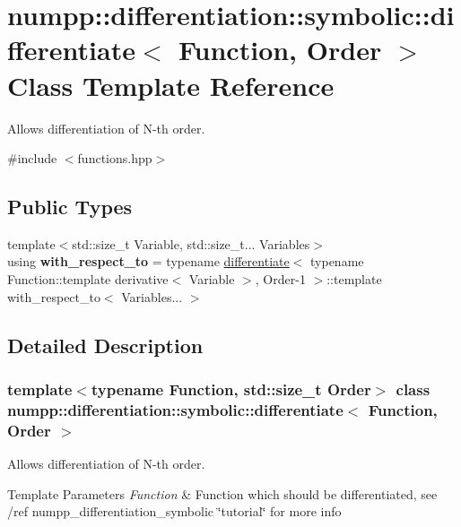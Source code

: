 \hypertarget{classnumpp_1_1differentiation_1_1symbolic_1_1differentiate}{}\section{numpp\+:\+:differentiation\+:\+:symbolic\+:\+:differentiate$<$ Function, Order $>$ Class Template Reference}
\label{classnumpp_1_1differentiation_1_1symbolic_1_1differentiate}


Allows differentiation of N-\/th order.  




{\ttfamily \#include $<$functions.\+hpp$>$}

\subsection*{Public Types}
\begin{DoxyCompactItemize}
\item 
\mbox{\label{classnumpp_1_1differentiation_1_1symbolic_1_1differentiate_ac0c973a49c1b2e262edd5345c4f569a7}} 
{\footnotesize template$<$std\+::size\+\_\+t Variable, std\+::size\+\_\+t... Variables$>$ }\\using {\bfseries with\+\_\+respect\+\_\+to} = typename \hyperlink{classnumpp_1_1differentiation_1_1symbolic_1_1differentiate}{differentiate}$<$ typename Function\+::template derivative$<$ Variable $>$, Order-\/1 $>$\+::template with\+\_\+respect\+\_\+to$<$ Variables... $>$
\end{DoxyCompactItemize}


\subsection{Detailed Description}
\subsubsection*{template$<$typename Function, std\+::size\+\_\+t Order$>$\newline
class numpp\+::differentiation\+::symbolic\+::differentiate$<$ Function, Order $>$}

Allows differentiation of N-\/th order. 


\begin{DoxyTemplParams}{Template Parameters}
{\em Function} & Function which should be differentiated, see /ref numpp\+\_\+differentiation\+\_\+symbolic \char`\"{}tutorial\char`\"{} for more info \\
\hline
\end{DoxyTemplParams}

